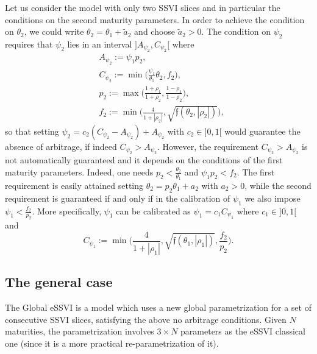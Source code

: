 \documentclass{article}
\begin{document}
	Let us consider the model with only two SSVI slices and in particular
the conditions on the second maturity parameters. In order to achieve
the condition on \(\theta_2\), we could write
\(\theta_2 = \theta_1 + \tilde a_2\) and choose \(\tilde a_2>0\). The
condition on \(\psi_2\) requires that \(\psi_2\) lies in an interval
\(]A_{\psi_2},C_{\psi_2}[\) where \begin{align*}
&A_{\psi_2} := \psi_1 p_2,\\
&C_{\psi_2} := \min\biggl(\frac{\psi_1}{\theta_1}\theta_2, f_2\biggr),\\
&p_2 := \max\biggl(\frac{1+\rho_1}{1+\rho_2},\frac{1-\rho_1}{1-\rho_2}\biggr),\\
&f_2 := \min\biggl(\frac{4}{1+|\rho_2|}, \sqrt{\mathfrak f(\theta_2,|\rho_2|)}\biggr),
\end{align*} so that setting
\(\psi_2 = c_2(C_{\psi_2}-A_{\psi_2})+A_{\psi_2}\) with \(c_2\in]0,1[\)
would guarantee the absence of arbitrage, if indeed
\(C_{\psi_2}> A_{\psi_2}\). However, the requirement
\(C_{\psi_2}> A_{\psi_2}\) is not automatically guaranteed and it
depends on the conditions of the first maturity parameters. Indeed, one
needs \(p_2<\frac{\theta_2}{\theta_1}\) and \(\psi_1 p_2<f_2\). The
first requirement is easily attained setting
\(\theta_2 = p_2\theta_1 + a_2\) with \(a_2>0\), while the second
requirement is guaranteed if and only if in the calibration of
\(\psi_1\) we also impose \(\psi_1<\frac{f_2}{p_2}\). More specifically,
\(\psi_1\) can be calibrated as \(\psi_1 = c_1 C_{\psi_1}\) where
\(c_1\in]0,1[\) and
\[C_{\psi_1} := \min\biggl(\frac{4}{1+|\rho_1|}, \sqrt{\mathfrak f(\theta_1,|\rho_1|)}, \frac{f_2}{p_2}\biggr).\]

	\hypertarget{the-general-case}{%
\subsection{The general case}\label{the-general-case}}

	The Global eSSVI is a model which uses a new global parametrization for
a set of consecutive SSVI slices, satisfying the above no arbitrage
conditions. Given \(N\) maturities, the parametrization involves
\(3\times N\) parameters as the eSSVI classical one (since it is a more
practical re-parametrization of it).
\end{document}
